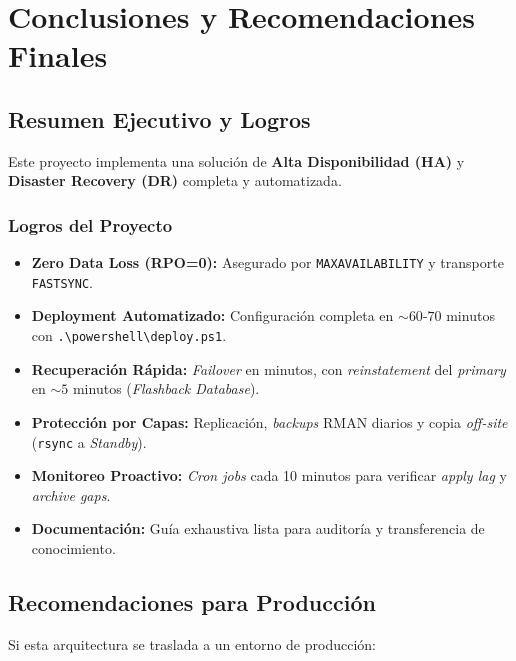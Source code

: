 \documentclass[11pt, a4paper]{report}
\begin{document}
\newpage

\chapter{Conclusiones y Recomendaciones Finales}

\section{Resumen Ejecutivo y Logros}

Este proyecto implementa una solución de \textbf{Alta Disponibilidad (HA)} y \textbf{Disaster Recovery (DR)} completa y automatizada.
\subsection{Logros del Proyecto}
\begin{itemize}
    \item \textbf{Zero Data Loss (RPO=0):} Asegurado por \texttt{MAXAVAILABILITY} y transporte \texttt{FASTSYNC}.
\item \textbf{Deployment Automatizado:} Configuración completa en $\sim 60$-$70$ minutos con \texttt{.\textbackslash powershell\textbackslash deploy.ps1}.
\item \textbf{Recuperación Rápida:} \textit{Failover} en minutos, con \textit{reinstatement} del \textit{primary} en $\sim 5$ minutos (\textit{Flashback Database}).
\item \textbf{Protección por Capas:} Replicación, \textit{backups} RMAN diarios y copia \textit{off-site} (\texttt{rsync} a \textit{Standby}).
\item \textbf{Monitoreo Proactivo:} \textit{Cron jobs} cada 10 minutos para verificar \textit{apply lag} y \textit{archive gaps}.
\item \textbf{Documentación:} Guía exhaustiva lista para auditoría y transferencia de conocimiento.
\end{itemize}

\section{Recomendaciones para Producción}

Si esta arquitectura se traslada a un entorno de producción:
\end{document}
